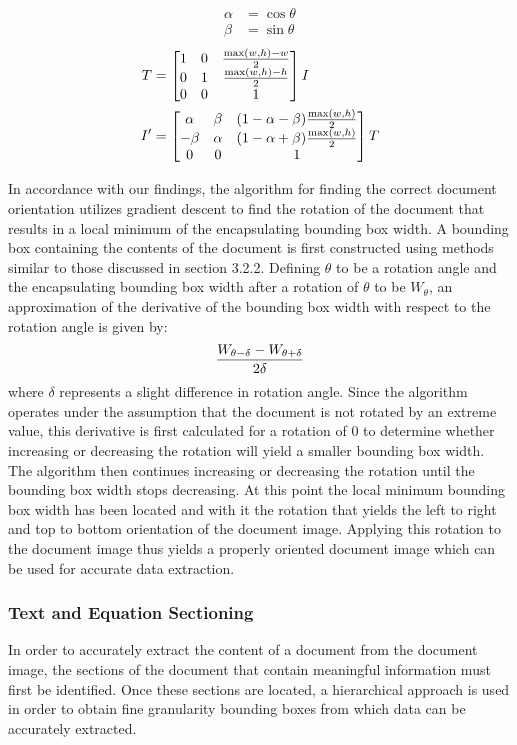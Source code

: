 \documentclass[12pt]{IEEEtran}
\begin{document}
\begin{align*}
\alpha &= \cos \theta \\
\beta &= \sin \theta
\end{align*}
\begin{align*}
T &= 
\left[
\begin{matrix}
1 & 0 & {\max(w,h) - w\over{2}} \\
0 & 1 & {\max(w,h) - h\over{2}} \\
0 & 0 & 1
\end{matrix}
\right]
I \\
I' &= 
\left[
\begin{matrix}
\alpha & \beta &  (1 - \alpha - \beta){\max(w,h)\over{2}}\\
-\beta & \alpha & (1 - \alpha + \beta){\max(w,h)\over{2}} \\
0 & 0 & 1
\end{matrix}
\right]
T
\end{align*}

In accordance with our findings, the algorithm for finding the correct document orientation utilizes  gradient descent to find the rotation of the document that results in a local minimum of the encapsulating bounding box width.  A bounding box containing the contents of the document is first constructed using methods similar to those discussed in section 3.2.2. Defining $\theta$ to be a rotation angle and the encapsulating bounding box width after a rotation of $\theta$ to be $W_{\theta}$, an approximation of the derivative of the bounding box width with respect to the rotation angle is given by:
\begin{align*}
{W_{\theta - \delta} - W_{\theta + \delta}\over{2\delta}}
\end{align*}
where $\delta$ represents a slight difference in rotation angle. Since the algorithm operates under the assumption that the document is not rotated by an extreme value, this derivative is first calculated for a rotation of 0 to determine whether increasing or decreasing the rotation will yield a smaller bounding box width. The algorithm then continues increasing or decreasing the rotation until the bounding box width stops decreasing. At this point the local minimum bounding box width has been located and with it the rotation that yields the left to right and top to bottom orientation of the document image. Applying this rotation to the document image thus yields a properly oriented document image which can be used for accurate data extraction.

\subsubsection{Text and Equation Sectioning}
In order to accurately extract the content of a document from the document image, the sections of the document that contain meaningful information must first be identified. Once these sections are located, a hierarchical approach is used in order to obtain fine granularity bounding boxes from which data can be accurately extracted.
\end{document}
